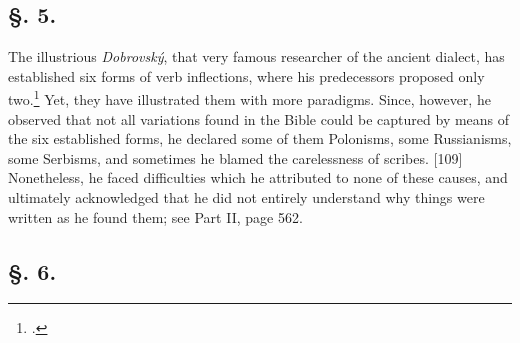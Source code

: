 \subsection*{\hspace*{\fill}§. 5.\hspace*{\fill}}

The illustrious \textit{Dobrovský}, that very famous researcher of the ancient dialect, has established six forms of verb inflections, where his predecessors proposed only two.\footnote{\citet[346--347, 384]{dobrovsky_institutiones_1822}.} Yet, they have illustrated them with more paradigms. Since, however, he observed that not all variations found in the Bible could be captured by means of the six established forms, he declared some of them Polonisms, some Russianisms, some Serbisms, and sometimes he blamed the carelessness of scribes. [109] Nonetheless, he faced difficulties which he attributed to none of these causes, and ultimately acknowledged that he did not entirely understand why things were written as he found them; see Part II, page 562.

\subsection*{\hspace*{\fill}§. 6.\hspace*{\fill}}

